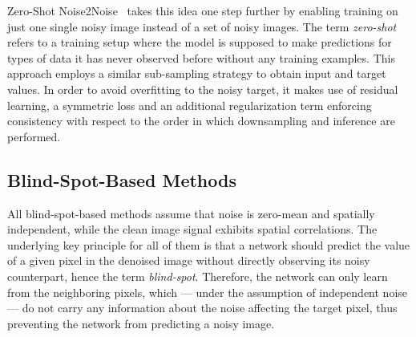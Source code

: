 Zero-Shot Noise2Noise~\cite{ZS-N2N} takes this idea one step further by enabling training on just one single noisy image instead of a set of noisy images.
The term \textit{zero-shot} refers to a training setup where the model is supposed to make predictions for types of data it has never observed before without any training examples.
This approach employs a similar sub-sampling strategy to obtain input and target values.
In order to avoid overfitting to the noisy target, it makes use of residual learning, a symmetric loss and an additional regularization term enforcing consistency with respect to the order in which downsampling and inference are performed.

\subsection{Blind-Spot-Based Methods}

All blind-spot-based methods assume that noise is zero-mean and spatially independent, while the clean image signal exhibits spatial correlations.
The underlying key principle for all of them is that a network should predict the value of a given pixel in the denoised image without directly observing its noisy counterpart, hence the term \textit{blind-spot}.
Therefore, the network can only learn from the neighboring pixels, which --- under the assumption of independent noise --- do not carry any information about the noise affecting the target pixel, thus preventing the network from predicting a noisy image.

